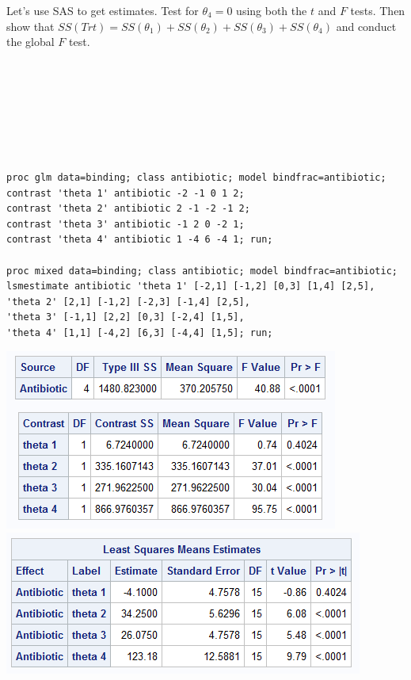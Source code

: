 Let's use SAS to get estimates.  Test for $\theta_4=0$ using both the $t$ and $F$ tests.  Then show that $SS(Trt)=SS(\theta_1)+SS(\theta_2)+SS(\theta_3)+SS(\theta_4)$ and conduct the global $F$ test.\\~\\~\\~\\~\\~\\~\\~\\
\begin{small}
\begin{verbatim}
proc glm data=binding; class antibiotic; model bindfrac=antibiotic;
contrast 'theta 1' antibiotic -2 -1 0 1 2;
contrast 'theta 2' antibiotic 2 -1 -2 -1 2;
contrast 'theta 3' antibiotic -1 2 0 -2 1;
contrast 'theta 4' antibiotic 1 -4 6 -4 1; run;

proc mixed data=binding; class antibiotic; model bindfrac=antibiotic;
lsmestimate antibiotic 'theta 1' [-2,1] [-1,2] [0,3] [1,4] [2,5],
'theta 2' [2,1] [-1,2] [-2,3] [-1,4] [2,5], 
'theta 3' [-1,1] [2,2] [0,3] [-2,4] [1,5], 
'theta 4' [1,1] [-4,2] [6,3] [-4,4] [1,5]; run;
\end{verbatim}
\end{small}

\begin{center}
\includegraphics[scale=0.75]{BindFracContrastSS}\includegraphics[scale=0.7]{BindFracContrastMixed}
\end{center}

